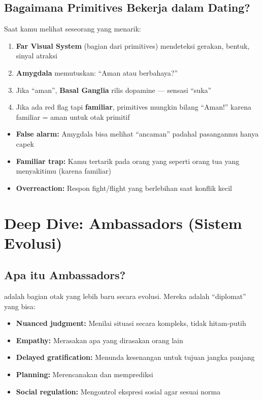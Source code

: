 \subsection{Bagaimana Primitives Bekerja dalam Dating?}

Saat kamu melihat seseorang yang menarik:

\begin{enumerate}
    \item \textbf{Far Visual System} (bagian dari primitives) mendeteksi gerakan, bentuk, sinyal atraksi
    \item \textbf{Amygdala} memutuskan: ``Aman atau berbahaya?''
    \item Jika ``aman'', \textbf{Basal Ganglia} rilis dopamine --- sensasi ``suka''
    \item Jika ada red flag tapi \textbf{familiar}, primitives mungkin bilang ``Aman!'' karena familiar = aman untuk otak primitif
\end{enumerate}

\begin{warningbox}
\begin{itemize}
    \item \textbf{False alarm:} Amygdala bisa melihat ``ancaman'' padahal pasanganmu hanya capek
    \item \textbf{Familiar trap:} Kamu tertarik pada orang yang seperti orang tua yang menyakitimu (karena familiar)
    \item \textbf{Overreaction:} Respon fight/flight yang berlebihan saat konflik kecil
\end{itemize}
\end{warningbox}

\section{Deep Dive: Ambassadors (Sistem Evolusi)}

\subsection{Apa itu Ambassadors?}

 adalah bagian otak yang lebih baru secara evolusi. Mereka adalah ``diplomat'' yang bisa:

\begin{praktikbox}
\begin{itemize}
    \item \textbf{Nuanced judgment:} Menilai situasi secara kompleks, tidak hitam-putih
    \item \textbf{Empathy:} Merasakan apa yang dirasakan orang lain
    \item \textbf{Delayed gratification:} Menunda kesenangan untuk tujuan jangka panjang
    \item \textbf{Planning:} Merencanakan dan memprediksi
    \item \textbf{Social regulation:} Mengontrol ekspresi sosial agar sesuai norma
\end{itemize}
\end{praktikbox}

